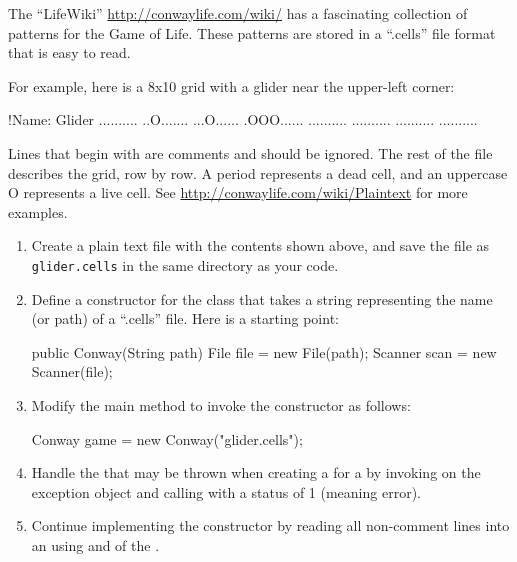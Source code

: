 \begin{exercise}
The ``LifeWiki'' \url{http://conwaylife.com/wiki/} has a fascinating collection of patterns for the Game of Life.
These patterns are stored in a ``.cells'' file format that is easy to read.

For example, here is a 8x10 grid with a glider near the upper-left corner:
\begin{stdout}
!Name: Glider
..........
..O.......
...O......
.OOO......
..........
..........
..........
..........
\end{stdout}

Lines that begin with \java{!} are comments and should be ignored.
The rest of the file describes the grid, row by row.
A period represents a dead cell, and an uppercase O represents a live cell.
See \url{http://conwaylife.com/wiki/Plaintext} for more examples.

\begin{enumerate}

\item Create a plain text file with the contents shown above, and save the file as \verb|glider.cells| in the same directory as your code.

\item Define a constructor for the  class that takes a string representing the name (or path) of a ``.cells'' file.
Here is a starting point:

\begin{code}
public Conway(String path) {
    File file = new File(path);
    Scanner scan = new Scanner(file);
}
\end{code}

\item Modify the main method to invoke the constructor as follows:

\begin{code}
Conway game = new Conway("glider.cells");
\end{code}

\item Handle the  that may be thrown when creating a  for a  by invoking  on the exception object and calling  with a status of 1 (meaning error).

\item Continue implementing the constructor by reading all non-comment lines into an  using  and  of the .


\end{enumerate}
\end{exercise}
